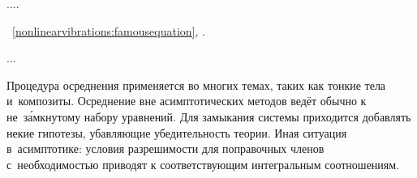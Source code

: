 ....




~\eqref{nonlinearvibrations:famousequation},
\ru{\:---}
.
%

...

\begin{otherlanguage}{russian}

Процедура осреднения применяется во многих темах,
таких как тонкие тела и~композиты.
Осреднение вне асимптотических методов
ведёт обычно к не~з\'{а}мкнутому набору уравнений.
Для замыкания системы приходится добавлять некие гипотезы,
убавляющие убедительность теории.
Иная ситуация в~асимптотике:
условия разрешимости для поправочных членов
с~необходимостью
приводят к соответствующим интегральным соотношениям.

\end{otherlanguage}



